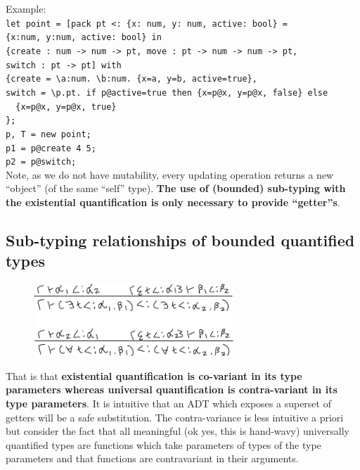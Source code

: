 \documentclass[20pt,a4paper,landscape]{extarticle}
\begin{document}
\begin{flushleft}
\begin{itemize}
\end{itemize}
\clearpage
Example:\\
\verb|let point = [pack pt <: {x: num, y: num, active: bool} =|\\
\verb|{x:num, y:num, active: bool} in|\\
\verb|{create : num -> num -> pt, move : pt -> num -> num -> pt,|\\
\verb|switch : pt -> pt] with|\\
\verb|{create = \a:num. \b:num. {x=a, y=b, active=true},|\\
\verb|switch = \p.pt. if p@active=true then {x=p@x, y=p@x, false} else|\\
\verb|  {x=p@x, y=p@x, true}|\\
\verb|};|\\
\verb|p, T = new point;|\\
\verb|p1 = p@create 4 5;|\\
\verb|p2 = p@switch;|\\
Note, as we do not have mutability, every updating operation returns a new ``object'' (of the same ``self'' type). \textbf{The use of (bounded) sub-typing with the existential quantification is only necessary to provide ``getter''s}.
\subsection{Sub-typing relationships of bounded quantified types}
\FloatBarrier
\begin{figure}[h]
\begin{center}
\includegraphics[width=0.67\textwidth]{meta/cs349/BoundedQuantificationRules.pdf}{}
\end{center}
\end{figure}
\FloatBarrier
That is that \textbf{existential quantification is co-variant in its type parameters whereas universal quantification is contra-variant in its type parameters}. It is intuitive that an ADT which exposes a superset of getters will be a safe substitution. The contra-variance is less intuitive a priori but consider the fact that all meaningful (ok yes, this is hand-wavy) universally quantified types are functions which take parameters of types of the type parameters and that functions are contravariant in their arguments.
\end{flushleft}
\end{document}
